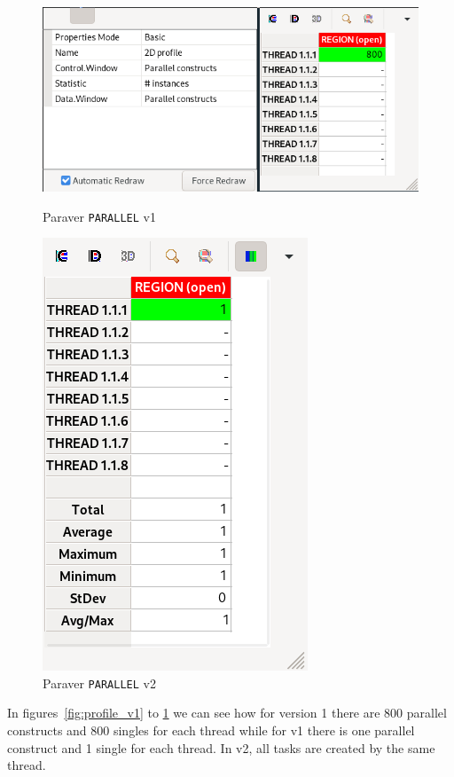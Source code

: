 \begin{figure}[H]
    \begin{minipage}{0.5\textwidth}
        \centering
        \includegraphics[scale=0.4]{captures/v1-parallels.png}
        \caption{Paraver \texttt{PARALLEL} v1}
        \label{fig:par_v1} 
    \end{minipage}
    \begin{minipage}{0.5\textwidth}
        \centering
        \includegraphics[scale=0.4]{captures/v2-parallel.png}
        \caption{Paraver \texttt{PARALLEL} v2}
        \label{fig:par_v2} 
    \end{minipage}
\end{figure}

In figures~\ref{fig:profile_v1} to \ref{fig:par_v2} we can see how for version 1 there are 800 parallel constructs
and 800 singles for each thread while for v1 there is one parallel construct and 1 single for each thread. In v2, all
tasks are created by the same thread.


